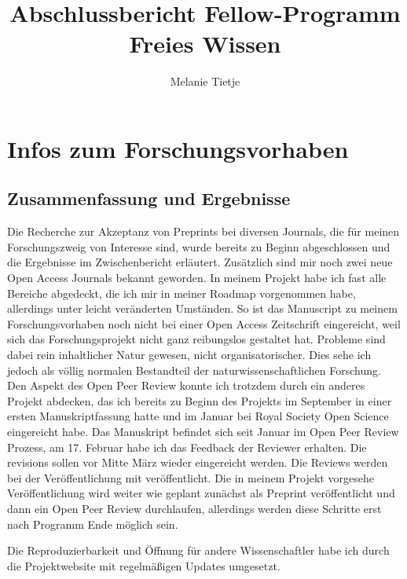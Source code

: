 \documentclass[11pt,a4paper]{article}
\begin{document}
\title{Abschlussbericht Fellow-Programm Freies Wissen}
\author{Melanie Tietje}
\maketitle


\section{Infos zum Forschungsvorhaben}%
\subsection{Zusammenfassung und Ergebnisse} %
Die Recherche zur Akzeptanz von Preprints bei diversen Journals, die für meinen Forschungszweig von Interesse sind, wurde bereits zu Beginn abgeschlossen und die Ergebnisse im Zwischenbericht erläutert. Zusätzlich sind mir noch zwei neue Open Access Journals bekannt geworden.
In meinem Projekt habe ich fast alle Bereiche abgedeckt, die ich mir in meiner Roadmap vorgenommen habe, allerdings unter leicht veränderten Umständen. So ist das Manuscript zu meinem Forschungsvorhaben noch nicht bei einer Open Access Zeitschrift eingereicht, weil sich das Forschungsprojekt nicht ganz reibungslos gestaltet hat. Probleme sind dabei rein inhaltlicher Natur gewesen, nicht organisatorischer. Dies sehe ich jedoch als völlig normalen Bestandteil der naturwissenschaftlichen Forschung. Den Aspekt des Open Peer Review konnte ich trotzdem durch ein anderes Projekt abdecken, das ich bereits zu Beginn des Projekts im September in einer ersten Manuskriptfassung hatte und im Januar bei Royal Society Open Science eingereicht habe. Das Manuskript befindet sich seit Januar im Open Peer Review Prozess, am 17. Februar habe ich das Feedback der Reviewer erhalten. Die revisions sollen vor Mitte März wieder eingereicht werden. Die Reviews werden bei der Veröffentlichung mit veröffentlicht. Die in meinem Projekt vorgesehe Veröffentlichung wird weiter wie geplant zunächst als Preprint veröffentlicht und dann ein Open Peer Review durchlaufen, allerdings werden diese Schritte erst nach Programm Ende möglich sein.

Die Reproduzierbarkeit und Öffnung für andere Wissenschaftler habe ich durch die Projektwebsite mit regelmäßigen Updates umgesetzt.
\end{document}
